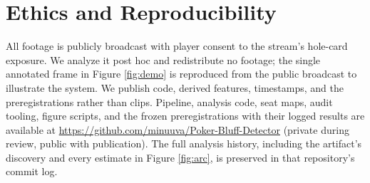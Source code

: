 \documentclass[conference]{IEEEtran}
\begin{document}
\section{Ethics and Reproducibility}

All footage is publicly broadcast with player consent to the stream's
hole-card exposure. We analyze it post hoc and redistribute no footage;
the single annotated frame in Figure \ref{fig:demo} is reproduced from
the public broadcast to illustrate the system. We publish code, derived
features, timestamps, and the preregistrations rather than clips. Pipeline, analysis code,
seat maps, audit tooling, figure scripts, and the frozen
preregistrations with their logged results are available at
\url{https://github.com/minuuva/Poker-Bluff-Detector} (private during
review, public with publication). The full analysis history, including
the artifact's discovery and every estimate in Figure \ref{fig:arc}, is
preserved in that repository's commit log.



\end{document}
